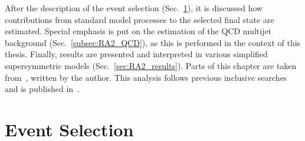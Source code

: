 After the description of the event selection (Sec.~\ref{sec:RA2_sel}), it is discussed how contributions from standard model processes to the selected final state are estimated. Special emphasis is put on the estimation of the QCD multijet background (Sec.~\ref{subsec:RA2_QCD}), as this is performed in the context of this thesis. Finally, results are presented and interpreted in various simplified supersymmetric models (Sec.~\ref{sec:RA2_results}). Parts of this chapter are taken from~\cite{bib:AN-12-350}, written by the author. This analysis follows previous inclusive searches~\cite{springerlink:10.1007/JHEP08(2011)155, Chatrchyan:2012lia} and is published in~\cite{Chatrchyan:2014lfa}.
    
\section{Event Selection}
\label{sec:RA2_sel}
